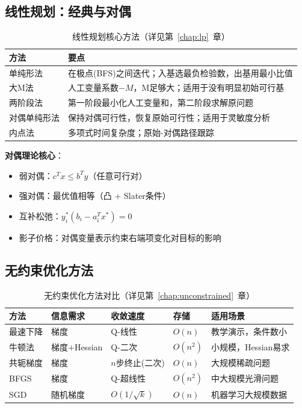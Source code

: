 \subsection{线性规划：经典与对偶}

\begin{table}[H]
\centering
\caption{线性规划核心方法（详见第~\ref{chap:lp}~章）}\label{tab:lp}
\begin{tabular}{lp{8cm}}
\toprule
\textbf{方法} & \textbf{要点} \\
\midrule
单纯形法 & 在极点(BFS)之间迭代；入基选最负检验数，出基用最小比值 \\
大M法 & 人工变量系数$-M$，M足够大；适用于没有明显初始可行基 \\
两阶段法 & 第一阶段最小化人工变量和，第二阶段求解原问题 \\
对偶单纯形法 & 保持对偶可行性，恢复原始可行性；适用于灵敏度分析 \\
内点法 & 多项式时间复杂度；原始-对偶路径跟踪 \\
\bottomrule
\end{tabular}
\end{table}

\textbf{对偶理论核心}：
\begin{itemize}
    \item 弱对偶：$c^T x \leq b^T y$（任意可行对）
    \item 强对偶：最优值相等（凸 + Slater条件）
    \item 互补松弛：$y_i^*(b_i - a_i^T x^*) = 0$
    \item 影子价格：对偶变量表示约束右端项变化对目标的影响
\end{itemize}

\subsection{无约束优化方法}

\begin{table}[H]
\centering
\small
\caption{无约束优化方法对比（详见第~\ref{chap:unconstrained}~章）}\label{tab:unconstrained}
\begin{tabular}{@{}>{\raggedright\arraybackslash}p{2cm}>{\raggedright\arraybackslash}p{2.5cm}>{\raggedright\arraybackslash}p{2.5cm}>{\raggedright\arraybackslash}p{1.5cm}>{\raggedright\arraybackslash}p{4cm}@{}}
\toprule
\textbf{方法} & \textbf{信息需求} & \textbf{收敛速度} & \textbf{存储} & \textbf{适用场景} \\
\midrule
最速下降 & 梯度 & Q-线性 & $O(n)$ & 教学演示，条件数小 \\
牛顿法 & 梯度$+$Hessian & Q-二次 & $O(n^2)$ & 小规模，Hessian易求 \\
共轭梯度 & 梯度 & $n$步终止(二次) & $O(n)$ & 大规模稀疏问题 \\
BFGS & 梯度 & Q-超线性 & $O(n^2)$ & 中大规模光滑问题 \\
SGD & 随机梯度 & $O(1/\sqrt{k})$ & $O(n)$ & 机器学习大规模数据 \\
\bottomrule
\end{tabular}
\end{table}

